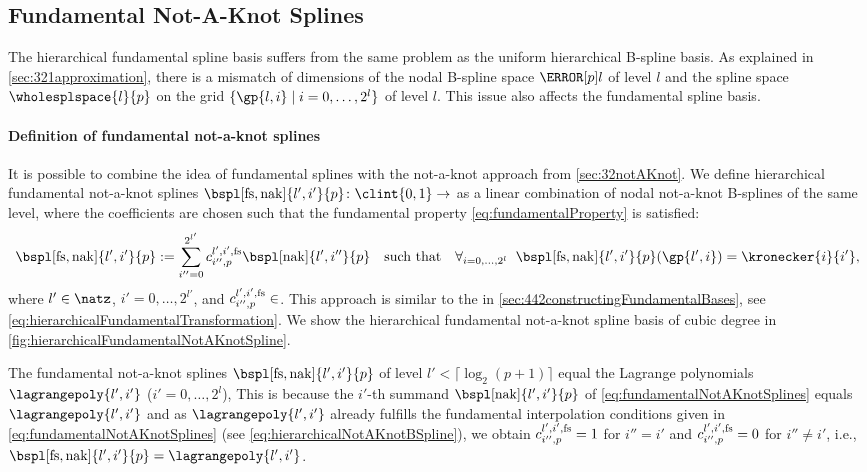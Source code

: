 \subsection{Fundamental Not-A-Knot Splines}
\label{sec:445fundamentalNotAKnotSplines}

The hierarchical fundamental spline basis suffers from the same problem
as the uniform hierarchical B-spline basis.
As explained in \cref{sec:321approximation}, there is a mismatch
of dimensions of the nodal B-spline space $\nsbspl{l}{p}$ of level $l$
and the spline space $\wholesplspace{l}{p}$ on the grid
$\{\gp{l,i} \mid i = 0, \dotsc, 2^l\}$ of level $l$.
This issue also affects the fundamental spline basis.

\paragraph{Definition of fundamental not-a-knot splines}

It is possible to combine the idea of fundamental splines
with the not-a-knot approach from \cref{sec:32notAKnot}.
We define hierarchical fundamental not-a-knot splines
$\bspl[\fs,\nak]{l',i'}{p}\colon \clint{0, 1} \to \real$ as a
linear combination of nodal not-a-knot B-splines of the same level,
where the coefficients are chosen such that the
fundamental property \eqref{eq:fundamentalProperty} is satisfied:
\begin{equation}
  \label{eq:fundamentalNotAKnotSplines}
  \bspl[\fs,\nak]{l',i'}{p}
  := \sum_{i''=0}^{2^{l'}}
  \fundsplcoeff[l',i',\fs]{i''}{p} \bspl[\nak]{l',i''}{p}
  \quad\text{such that}\quad
  \falarge{i = 0, \dotsc, 2^l}{
    \bspl[\fs,\nak]{l',i'}{p}(\gp{l',i}) = \kronecker{i}{i'}
  },
\end{equation}
where $l' \in \natz$, $i' = 0, \dotsc, 2^{l'}$, and
$\fundsplcoeff[l',i',\fs]{i''}{p} \in \real$.
This approach is similar to the \hftr in
\cref{sec:442constructingFundamentalBases},
see \cref{eq:hierarchicalFundamentalTransformation}.
We show the hierarchical fundamental not-a-knot spline basis
of cubic degree in \cref{fig:hierarchicalFundamentalNotAKnotSpline}.

The fundamental not-a-knot splines $\bspl[\fs,\nak]{l',i'}{p}$
of level $l' < \lceil\log_2(p+1)\rceil$ equal the Lagrange polynomials
$\lagrangepoly{l',i'}$ ($i' = 0, \dotsc, 2^l$),
This is because the $i'$-th summand $\bspl[\nak]{l',i'}{p}$
of \eqref{eq:fundamentalNotAKnotSplines} equals $\lagrangepoly{l',i'}$ and
as $\lagrangepoly{l',i'}$ already fulfills the
fundamental interpolation conditions given in
\eqref{eq:fundamentalNotAKnotSplines}
(see \cref{eq:hierarchicalNotAKnotBSpline}),
we obtain $\fundsplcoeff[l',i',\fs]{i''}{p} = 1$
for $i'' = i'$ and $\fundsplcoeff[l',i',\fs]{i''}{p} = 0$ for
$i'' \not= i'$, i.e.,
$\bspl[\fs,\nak]{l',i'}{p} = \lagrangepoly{l',i'}$.

